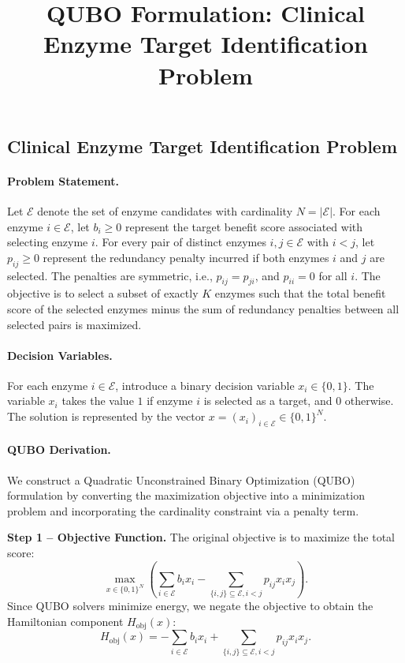 \documentclass[12pt]{article}
\title{QUBO Formulation: Clinical Enzyme Target Identification Problem}
\date{}
\begin{document}
\maketitle

\subsection*{Clinical Enzyme Target Identification Problem}

\paragraph{Problem Statement.}
Let $\mathcal{E}$ denote the set of enzyme candidates with cardinality $N = |\mathcal{E}|$. For each enzyme $i \in \mathcal{E}$, let $b_i \geq 0$ represent the target benefit score associated with selecting enzyme $i$. For every pair of distinct enzymes $i, j \in \mathcal{E}$ with $i < j$, let $p_{ij} \geq 0$ represent the redundancy penalty incurred if both enzymes $i$ and $j$ are selected. The penalties are symmetric, i.e., $p_{ij} = p_{ji}$, and $p_{ii} = 0$ for all $i$. The objective is to select a subset of exactly $K$ enzymes such that the total benefit score of the selected enzymes minus the sum of redundancy penalties between all selected pairs is maximized.

\paragraph{Decision Variables.}
For each enzyme $i \in \mathcal{E}$, introduce a binary decision variable $x_i \in \{0, 1\}$. The variable $x_i$ takes the value $1$ if enzyme $i$ is selected as a target, and $0$ otherwise. The solution is represented by the vector $x = (x_i)_{i \in \mathcal{E}} \in \{0, 1\}^N$.

\paragraph{QUBO Derivation.}
We construct a Quadratic Unconstrained Binary Optimization (QUBO) formulation by converting the maximization objective into a minimization problem and incorporating the cardinality constraint via a penalty term.

\textbf{Step 1 -- Objective Function.}
The original objective is to maximize the total score:
\begin{equation}
    \max_{x \in \{0,1\}^N} \left( \sum_{i \in \mathcal{E}} b_i x_i - \sum_{\{i,j\} \subseteq \mathcal{E}, i < j} p_{ij} x_i x_j \right).
\end{equation}
Since QUBO solvers minimize energy, we negate the objective to obtain the Hamiltonian component $H_{\text{obj}}(x)$:
\begin{equation}
    H_{\text{obj}}(x) = -\sum_{i \in \mathcal{E}} b_i x_i + \sum_{\{i,j\} \subseteq \mathcal{E}, i < j} p_{ij} x_i x_j.
\end{equation}
\end{document}
